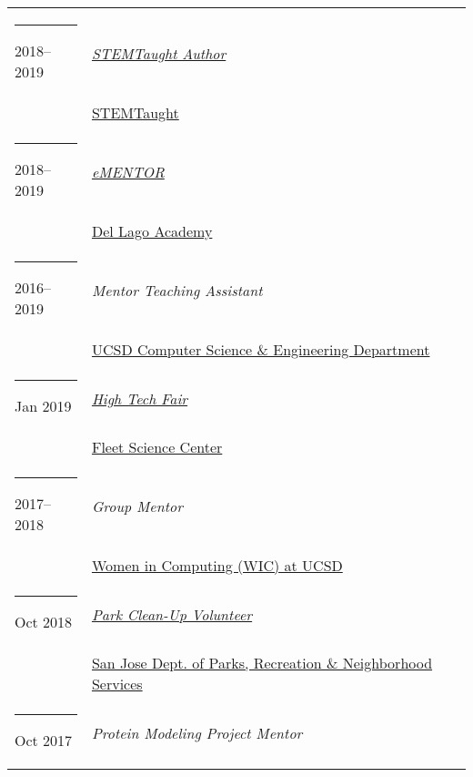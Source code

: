 \documentclass[margin,line]{res}
\begin{document}
\begin{resume}
\begin{longtable}{@{}p{0.7in}p{4in}}
\hspace*{-4mm} \rule{-1mm}{5mm} 2018--2019 & \href{https://www.stemtaught.com/writingcontestoverview}{\textit{STEMTaught Author}}\\*
\hspace*{-4mm} & \hspace{4mm} \href{https://www.stemtaught.com/}{STEMTaught}\\
\hspace*{-4mm} \rule{-1mm}{5mm} 2018--2019 & \href{https://www.dellagoacademy.org/apps/pages/index.jsp?uREC_ID=1248617&type=d&pREC_ID=1474743}{\textit{eMENTOR}}\\*
\hspace*{-4mm} & \hspace{4mm} \href{https://www.dellagoacademy.org/}{Del Lago Academy}\\
\hspace*{-4mm} \rule{-1mm}{5mm} 2016--2019 & \textit{Mentor Teaching Assistant}\\*
\hspace*{-4mm} & \hspace{4mm} \href{https://cse.ucsd.edu/}{UCSD Computer Science \& Engineering Department}\\
\hspace*{-4mm} \rule{-1mm}{5mm} Jan 2019 & \href{https://www.rhfleet.org/events/high-tech-fair}{\textit{High Tech Fair}}\\*
\hspace*{-4mm} & \hspace{4mm} \href{https://www.rhfleet.org/}{Fleet Science Center}\\
\hspace*{-4mm} \rule{-1mm}{5mm} 2017--2018 & \textit{Group Mentor}\\*
\hspace*{-4mm} & \hspace{4mm} \href{http://wic.ucsd.edu/}{Women in Computing (WIC) at UCSD}\\
\hspace*{-4mm} \rule{-1mm}{5mm} Oct 2018 & \href{http://sanjoseca.gov/DocumentCenter/View/77567}{\textit{Park Clean-Up Volunteer}}\\*
\hspace*{-4mm} & \hspace{4mm} \href{http://www.sanjoseca.gov/index.aspx?NID=204}{San Jose Dept. of Parks, Recreation \& Neighborhood Services}\\
\hspace*{-4mm} \rule{-1mm}{5mm} Oct 2017 & \textit{Protein Modeling Project Mentor}\\*

\end{longtable}
\end{resume}
\end{document}
